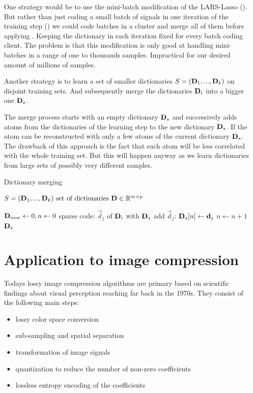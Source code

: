 One strategy would be to use the mini-batch
modification of the LARS-Lasso (). But rather
than just coding a small batch of signals in one iteration of the training
step () we could code batches in 
a cluster and merge all of them before applying . Keeping
the dictionary in each iteration fixed for every batch coding client. The
problem is that this modification is only good at handling mini-batches in a
range of one to thousands samples. Impractical for our desired amount of
millions of samples.

Another strategy is to learn a set of smaller dictionaries $S =
(\boldsymbol{\mathrm{D}}_1, ..., \boldsymbol{\mathrm{D}}_k)$ on disjoint training sets. And subsequently merge
the dictionaries $\boldsymbol{\mathrm{D}}_i$ into a bigger one $\boldsymbol{\mathrm{D}}_{s}$. 

The merge process starts with an empty dictionary $\boldsymbol{\mathrm{D}}_{s}$ and
successively adds atoms from the dictionaries of the learning step to the new
dictionary $\boldsymbol{\mathrm{D}}_{s}$. If the atom can be reconstructed with only a few
atoms of the current dictionary $\boldsymbol{\mathrm{D}}_{s}$. 
The drawback of this approach is the fact that each atom will be less
correlated with the whole training set. But this will happen anyway as we learn
dictionaries from large sets of possibly very different samples. 

\begin{algorithm}[H]
\caption{Dictionary merging}
\label{alg:merging}
\begin{algorithmic}[1]
\REQUIRE $ S = (\boldsymbol{\mathrm{D}}_1, ..., \boldsymbol{\mathrm{D}}_k) \text{ set of dictionaries } \boldsymbol{\mathrm{D}}
\in \mathbb{R}^{m\times p}$

\STATE $\boldsymbol{\mathrm{D}}_{new} \gets 0, n \gets 0$
\STATE sparse code: $\vec{d}_j$ of $\boldsymbol{\mathrm{D}}_i$ with $\boldsymbol{\mathrm{D}}_{s}$
\STATE add $\vec{d}_j$: $\boldsymbol{\mathrm{D}}_{s}[n] \gets \boldsymbol{\mathrm{d}}_{j}$
\STATE $n \gets n+1$
\ENDIF
\ENDFOR
\ENDFOR
\RETURN $\boldsymbol{\mathrm{D}}_s$
\end{algorithmic}
\end{algorithm}



\section{Application to image compression}
\label{sec:compression}
Todays lossy image compression algorithms are primary based on scientific
findings about visual perception reaching far back in the 1970s.
They consist of the following main steps:
\begin{itemize}
 \item lossy color space conversion
 \item sub-sampling and spatial separation
 \item transformation of image signals
 \item quantization to reduce the number of non-zero coefficients
 \item lossless entropy encoding of the coefficients 
\end{itemize}

